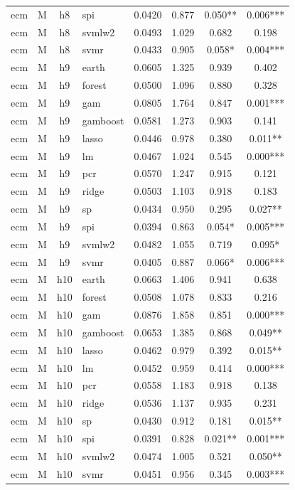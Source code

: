 \begin{ThreePartTable}
\begin{longtable}[t]{llclcccc}
ecm & M & h8 & spi & 0.0420 & 0.877 & 0.050** & 0.006***\\
ecm & M & h8 & svmlw2 & 0.0493 & 1.029 & 0.682 & 0.198\\
ecm & M & h8 & svmr & 0.0433 & 0.905 & 0.058* & 0.004***\\
\addlinespace
ecm & M & h9 & earth & 0.0605 & 1.325 & 0.939 & 0.402\\
ecm & M & h9 & forest & 0.0500 & 1.096 & 0.880 & 0.328\\
ecm & M & h9 & gam & 0.0805 & 1.764 & 0.847 & 0.001***\\
ecm & M & h9 & gamboost & 0.0581 & 1.273 & 0.903 & 0.141\\
ecm & M & h9 & lasso & 0.0446 & 0.978 & 0.380 & 0.011**\\
ecm & M & h9 & lm & 0.0467 & 1.024 & 0.545 & 0.000***\\
ecm & M & h9 & pcr & 0.0570 & 1.247 & 0.915 & 0.121\\
ecm & M & h9 & ridge & 0.0503 & 1.103 & 0.918 & 0.183\\
ecm & M & h9 & sp & 0.0434 & 0.950 & 0.295 & 0.027**\\
ecm & M & h9 & spi & 0.0394 & 0.863 & 0.054* & 0.005***\\
ecm & M & h9 & svmlw2 & 0.0482 & 1.055 & 0.719 & 0.095*\\
ecm & M & h9 & svmr & 0.0405 & 0.887 & 0.066* & 0.006***\\
\addlinespace
ecm & M & h10 & earth & 0.0663 & 1.406 & 0.941 & 0.638\\
ecm & M & h10 & forest & 0.0508 & 1.078 & 0.833 & 0.216\\
ecm & M & h10 & gam & 0.0876 & 1.858 & 0.851 & 0.000***\\
ecm & M & h10 & gamboost & 0.0653 & 1.385 & 0.868 & 0.049**\\
ecm & M & h10 & lasso & 0.0462 & 0.979 & 0.392 & 0.015**\\
ecm & M & h10 & lm & 0.0452 & 0.959 & 0.414 & 0.000***\\
ecm & M & h10 & pcr & 0.0558 & 1.183 & 0.918 & 0.138\\
ecm & M & h10 & ridge & 0.0536 & 1.137 & 0.935 & 0.231\\
ecm & M & h10 & sp & 0.0430 & 0.912 & 0.181 & 0.015**\\
ecm & M & h10 & spi & 0.0391 & 0.828 & 0.021** & 0.001***\\
ecm & M & h10 & svmlw2 & 0.0474 & 1.005 & 0.521 & 0.050**\\
ecm & M & h10 & svmr & 0.0451 & 0.956 & 0.345 & 0.003***\\

\end{longtable}
\end{ThreePartTable}
